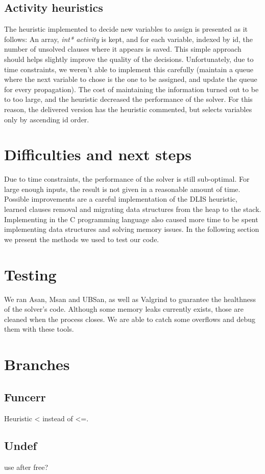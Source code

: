     \subsection{Activity heuristics}
    The heuristic implemented to decide new variables to assign is presented as it follows: An array, \textit{int* activity} is kept, and for each variable, indexed by id, the number of unsolved clauses where it appears is saved. This simple approach should helps slightly improve the quality of the decisions. Unfortunately, due to time constraints, we weren't able to implement this carefully (maintain a queue where the next variable to chose is the one to be assigned, and update the queue for every propagation). The cost of maintaining the information turned out to be to too large, and the heuristic decreased the performance of the solver. For this reason, the delivered version has the heuristic commented, but selects variables only by ascending id order. \\
    
    \section{Difficulties and next steps}
    Due to time constraints, the performance of the solver is still sub-optimal. For large enough inputs, the result is not given in a reasonable amount of time. Possible improvements are a careful implementation of the DLIS heuristic, learned clauses removal and migrating data structures from the heap to the stack. \\
    Implementing in the C programming language also caused more time to be spent implementing data structures and solving memory issues. In the following section we present the methods we used to test our code. \\
    
    \section{Testing}
    We ran Asan, Msan and UBSan, as well as Valgrind to guarantee the healthness of the solver's code. Although some memory leaks currently exists, those are cleaned when the process closes. We are able to catch some overflows and debug them with these tools. \\
    
    \section{Branches}
    \subsection{Funcerr}
    Heuristic < instead of <=.
    \subsection{Undef}
    use after free?
    
    

